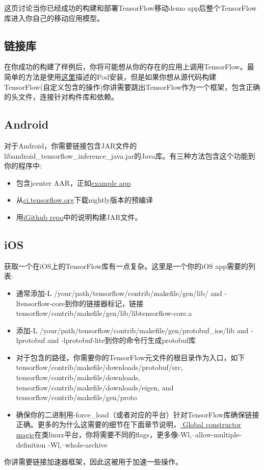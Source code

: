 这页讨论当你已经成功的构建和部署TensorFlow移动demo app后整个TensorFlow库进入你自己的移动应用模型。
\subsection{链接库}
在你成功的构建了样例后，你将可能想从你的存在的应用上调用TensorFlow。最简单的方法是使用\href{https://www.tensorflow.org/mobile/ios_build?hl=zh-cn#using_cocoapods}{这里}描述的Pod安装，但是如果你想从源代码构建TensorFlow(自定义包含的操作)你讲需要跳出TensorFlow作为一个框架，包含正确的头文件，连接针对构件库和依赖。
\subsection{Android}
对于Android，你需要链接包含JAR文件的libandroid\_tensorflow\_inference\_java.jar的Java库。有三种方法包含这个功能到你的程序中:
\begin{itemize}
\item 包含jcenter AAR，正如\href{https://github.com/googlecodelabs/tensorflow-for-poets-2/blob/master/android/build.gradle#L59-L65}{example app}
\item 从\href{http://ci.tensorflow.org/view/Nightly/job/nightly-android/lastSuccessfulBuild/artifact/out/?hl=zh-cn}{ci.tensorflow.org}下载nightly版本的预编译
\item 用\href{https://github.com/tensorflow/tensorflow/tree/master/tensorflow/contrib/android}{iGithub repo}中的说明构建JAR文件。
\end{itemize}
\subsection{iOS}

获取一个在iOS上的TensorFlow库有一点复杂。这里是一个你的iOS app需要的列表:
\begin{itemize}
\item 通常添加-L /your/path/tensorflow/contrib/makefile/gen/lib/ and -ltensorflow-core到你的链接器标记，链接 tensorflow/contrib/makefile/gen/lib/libtensorflow-core.a
\item 添加-L /your/path/tensorflow/contrib/makefile/gen/protobuf\_ios/lib and -lprotobuf and -lprotobuf-lite到你的命令行生成protobuf库
\item 对于包含的路径，你需要你的TensorFlow元文件的根目录作为入口，如下tensorflow/contrib/makefile/downloads/protobuf/src, tensorflow/contrib/makefile/downloads, tensorflow/contrib/makefile/downloads/eigen, and tensorflow/contrib/makefile/gen/proto 
\item 确保你的二进制用-force\_load（或者对应的平台）针对TensorFlow库确保链接正确。更多的为什么这需要的细节在下面章节说明，\href{https://www.tensorflow.org/mobile/linking_libs?hl=zh-cn#global_constructor_magic}{ Global constructor magic}在类linux平台，你将需要不同的flags，更多像-Wl,--allow-multiple-definition -Wl,--whole-archive
\end{itemize}
你讲需要链接加速器框架，因此这被用于加速一些操作。
